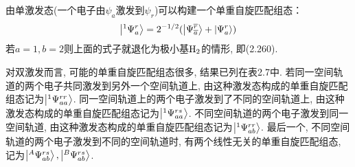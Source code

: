由单激发态(一个电子由$\psi_a$激发到$\psi_r$)可以构建一个单重自旋匹配组态：
\begin{align}
\Ket{^1\Psi_a^r} = 2^{-1/2}(\Ket{\Psi_{\overline{a}}^{\overline{r}}} + \Ket{\Psi_a^r})
\end{align}
若$a=1,b=2$则上面的式子就退化为极小基$\mathrm{H}_2$的情形, 即(2.260).

对双激发而言, 可能的单重自旋匹配组态很多, 结果已列在表2.7中. 若同一空间轨道的两个电子共同激发到另外一个空间轨道上, 由这种激发态构成的单重自旋匹配组态记为$\Ket{^1\Psi_{aa}^{rr}}$. 同一空间轨道上的两个电子激发到了不同的空间轨道上, 由这种激发态构成的单重自旋匹配组态记为$\Ket{^1\Psi_{aa}^{rs}}$. 不同空间轨道的两个电子激发到同一空间轨道, 由这种激发态构成的单重自旋匹配组态记为$\Ket{^1\Psi_{ab}^{rr}}$. 最后一个, 不同空间轨道的两个电子激发到不同的空间轨道时, 有两个线性无关的单重自旋匹配组态, 记为$\Ket{^A\Psi_{ab}^{rs}}, \Ket{^B\Psi_{ab}^{rs}}$.

